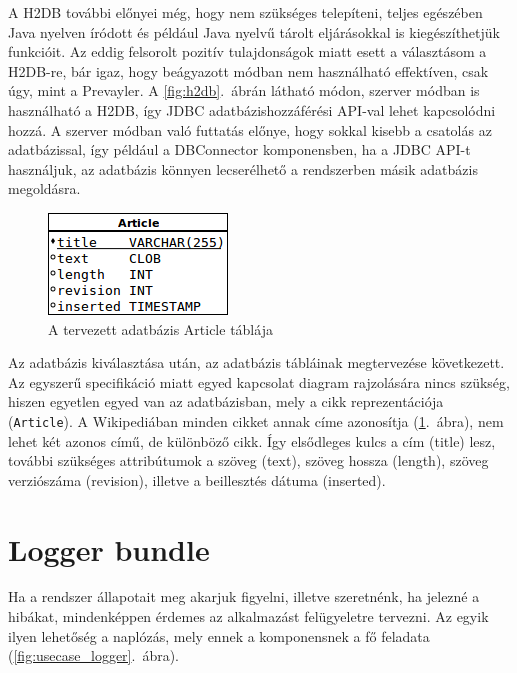 \begin{enumerate}
A H2DB további előnyei még, hogy nem szükséges telepíteni, teljes egészében Java nyelven íródott és például Java nyelvű tárolt eljárásokkal is kiegészíthetjük funkcióit. Az eddig felsorolt pozitív tulajdonságok miatt esett a választásom a H2DB-re, bár igaz, hogy beágyazott módban nem használható effektíven, csak úgy, mint a Prevayler. A \ref{fig:h2db}.~ábrán látható módon, szerver módban is használható a H2DB, így JDBC adatbázishozzáférési API-val lehet kapcsolódni hozzá. A szerver módban való futtatás előnye, hogy sokkal kisebb a csatolás az adatbázissal, így például a DBConnector komponensben, ha a JDBC API-t használjuk, az adatbázis könnyen lecserélhető a rendszerben másik adatbázis megoldásra.

\end{enumerate}

\begin{figure}[htp]
\centering
\includegraphics[scale=0.8]{img/database_article}
\caption{A tervezett adatbázis Article táblája}
\label{fig:database_article}
\end{figure}

Az adatbázis kiválasztása után, az adatbázis tábláinak megtervezése következett. Az egyszerű specifikáció miatt egyed kapcsolat diagram rajzolására nincs szükség, hiszen egyetlen egyed van az adatbázisban, mely a cikk reprezentációja (\texttt{Article}). A Wikipediában minden cikket annak címe azonosítja (\ref{fig:database_article}.~ábra), nem lehet két azonos című, de különböző cikk. Így elsődleges kulcs a cím (title) lesz, további szükséges attribútumok a szöveg (text), szöveg hossza (length), szöveg verziószáma (revision), illetve a beillesztés dátuma (inserted).


\section{Logger bundle}
\label{sec:loggerbundle}

Ha a rendszer állapotait meg akarjuk figyelni, illetve szeretnénk, ha jelezné a hibákat, mindenképpen érdemes az alkalmazást felügyeletre tervezni. Az egyik ilyen lehetőség a naplózás, mely ennek a komponensnek a fő feladata (\ref{fig:usecase_logger}.~ábra).

